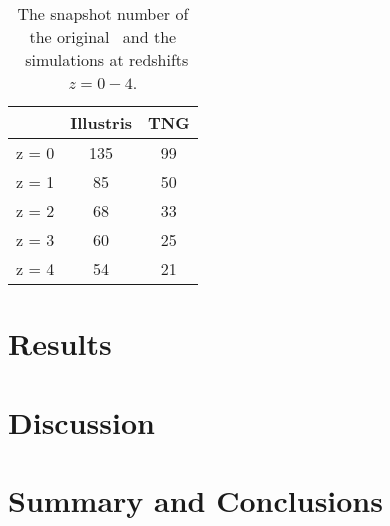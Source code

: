 \documentclass[twocolumn]{aastex631}
\begin{document}
\begin{table}[]
  \centering
  \begin{tabular}{l|cc}
    \hline \hline
   & Illustris & TNG  \\ 
  \hline
  z = 0   &   135  &   99   \\
  z = 1   &   85   &   50   \\
  z = 2   &   68   &   33   \\
  z = 3   &   60   &   25   \\
  z = 4   &   54   &   21   \\
  \hline \hline
  \end{tabular}
  \caption{\label{tab:equiv-snapshot} The snapshot number of the original \ill\ and the \tng\ simulations at redshifts $z=0-4$.}
\end{table}



\section{Results}
\label{sec:results}


\section{Discussion}
\label{sec:discussion}


\section{Summary and Conclusions}
\label{sec:summary}


{}

\end{document}
